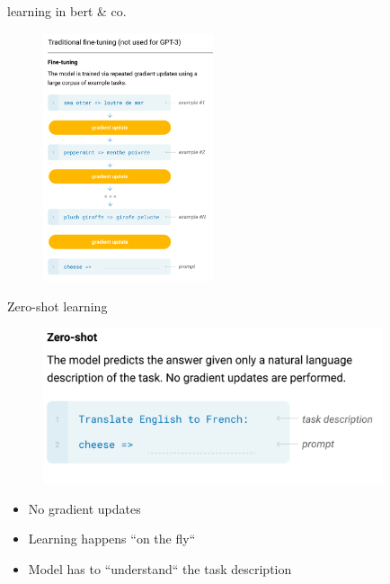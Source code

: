 \begin{frame}{learning in bert \& co.}

\vfill

	\begin{figure}
		\centering
		\includegraphics[width=5cm]{figure/gptnofinetuning.png}\\
	\end{figure}

\vfill

\end{frame}


\begin{frame}{Zero-shot learning}

\vfill

	\begin{figure}
		\centering
		\includegraphics[width=10cm]{figure/gptzeroshot.png}\\
	\end{figure}

\begin{itemize}
	\item No gradient updates
	\item Learning happens ``on the fly``
	\item Model has to ``understand`` the task description
\end{itemize}

\vfill

\end{frame}

